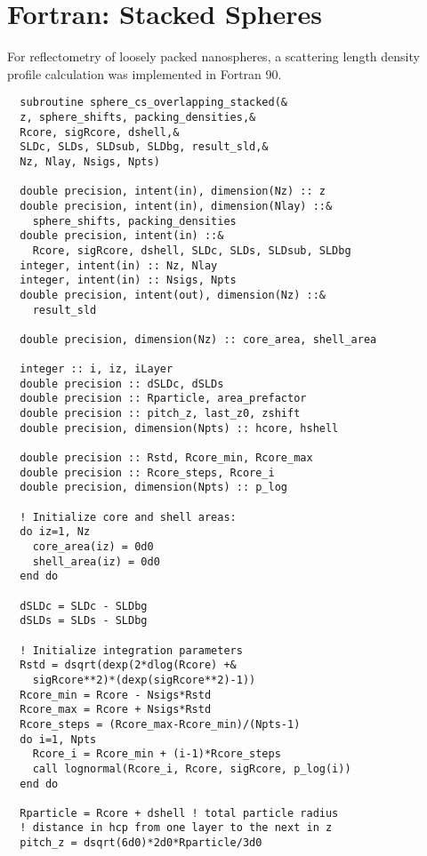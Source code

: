 \documentclass[\main/dresen_thesis.tex]{subfiles}
\begin{document}
\section{Fortran: Stacked Spheres}\label{ch:appendix:code:stackedSpheres}
For reflectometry of loosely packed nanospheres, a scattering length density profile calculation was implemented in  Fortran 90.

\begin{lstlisting}
  subroutine sphere_cs_overlapping_stacked(&
  z, sphere_shifts, packing_densities,&
  Rcore, sigRcore, dshell,&
  SLDc, SLDs, SLDsub, SLDbg, result_sld,&
  Nz, Nlay, Nsigs, Npts)
  
  double precision, intent(in), dimension(Nz) :: z
  double precision, intent(in), dimension(Nlay) ::&
    sphere_shifts, packing_densities
  double precision, intent(in) ::&
    Rcore, sigRcore, dshell, SLDc, SLDs, SLDsub, SLDbg
  integer, intent(in) :: Nz, Nlay
  integer, intent(in) :: Nsigs, Npts
  double precision, intent(out), dimension(Nz) ::&
    result_sld

  double precision, dimension(Nz) :: core_area, shell_area

  integer :: i, iz, iLayer
  double precision :: dSLDc, dSLDs
  double precision :: Rparticle, area_prefactor
  double precision :: pitch_z, last_z0, zshift
  double precision, dimension(Npts) :: hcore, hshell

  double precision :: Rstd, Rcore_min, Rcore_max
  double precision :: Rcore_steps, Rcore_i
  double precision, dimension(Npts) :: p_log

  ! Initialize core and shell areas:
  do iz=1, Nz
    core_area(iz) = 0d0
    shell_area(iz) = 0d0
  end do

  dSLDc = SLDc - SLDbg
  dSLDs = SLDs - SLDbg

  ! Initialize integration parameters
  Rstd = dsqrt(dexp(2*dlog(Rcore) +&
    sigRcore**2)*(dexp(sigRcore**2)-1))
  Rcore_min = Rcore - Nsigs*Rstd
  Rcore_max = Rcore + Nsigs*Rstd
  Rcore_steps = (Rcore_max-Rcore_min)/(Npts-1)
  do i=1, Npts
    Rcore_i = Rcore_min + (i-1)*Rcore_steps
    call lognormal(Rcore_i, Rcore, sigRcore, p_log(i))
  end do

  Rparticle = Rcore + dshell ! total particle radius
  ! distance in hcp from one layer to the next in z
  pitch_z = dsqrt(6d0)*2d0*Rparticle/3d0


\end{lstlisting}
\end{document}
